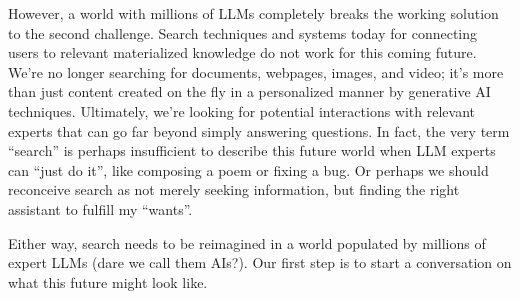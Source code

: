 \documentclass{article}
\begin{document}
However, a world with millions of LLMs completely breaks the working solution to the second challenge.
Search techniques and systems today for connecting users to relevant materialized knowledge do not work for this coming future.
We're no longer searching for documents, webpages, images, and video; it's more than just content created on the fly in a personalized manner by generative AI techniques.
Ultimately, we're looking for potential interactions with relevant experts that can go far beyond simply answering questions.
In fact, the very term ``search'' is perhaps insufficient to describe this future world when LLM experts can ``just do it'', like composing a poem or fixing a bug.
Or perhaps we should reconceive search as not merely seeking information, but finding the right assistant to fulfill my ``wants''.

Either way, search needs to be reimagined in a world populated by millions of expert LLMs (dare we call them AIs?).
Our first step is to start a conversation on what this future might look like.



\end{document}
